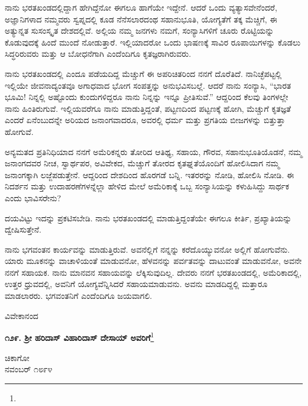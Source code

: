 ನಾನು ಭರತಖಂಡದಲ್ಲಿದ್ದಾಗ ಹೇಗಿದ್ದೆನೋ ಈಗಲೂ ಹಾಗೆಯೇ ಇದ್ದೇನೆ. ಆದರೆ ಒಂದು ವ್ಯತ್ಯಾಸವೇನೆಂದರೆ, ಅಜ್ಞಾನಿಗಳಾದ ನಮ್ಮವರು ಸ್ವಪ್ನದಲ್ಲಿ ಕೂಡ ನೆನೆಸಲಾರದಂಥ ಸಹಾನುಭೂತಿ, ಯೋಗ್ಯತೆಗೆ ತಕ್ಕ ಮೆಚ್ಚಿಗೆ, ಈ ಅತ್ಯುನ್ನತ ಸುಸಂಸ್ಕೃತ ದೇಶದಲ್ಲಿವೆ. ಅಲ್ಲಿಯ ನಮ್ಮ ಜನಗಳು ನಮಗೆ, ಸಂನ್ಯಾಸಿಗಳಿಗೆ ಚೂರು ರೊಟ್ಟಿಯನ್ನು ಕೊಡುವುದಕ್ಕೆ ಹಿಂದೆ ಮುಂದೆ ನೋಡುತ್ತಾರೆ. ಇಲ್ಲಿಯಾದರೋ ಒಂದು ಭಾಷಣಕ್ಕೆ ಸಾವಿರ ರೂಪಾಯಿಗಳನ್ನು ಕೊಡಲು ಸಿದ್ಧರಿರುವರು ಮತ್ತು ಆ ಬೋಧನೆಗಾಗಿ ಎಂದೆಂದಿಗೂ ಕೃತಜ್ಞರಾಗಿರುವರು.

ನಾನು ಭರತಖಂಡದಲ್ಲಿ ಎಂದೂ ಪಡೆಯದಿದ್ದ ಮೆಚ್ಚುಗೆ ಈ ಅಪರಿಚಿತರಿಂದ ನನಗೆ ದೊರೆತಿದೆ. ನಾನಿಚ್ಛೆಪಟ್ಟಲ್ಲಿ ಇಲ್ಲಿಯೇ ಜೀವನಾದ್ಯಂತವೂ ಅಗಾಧವಾದ ಭೋಗ ಸಂಪತ್ತನ್ನು ಅನುಭವಿಸಬಲ್ಲೆ. ಆದರೆ ನಾನು ಸಂನ್ಯಾಸಿ, “ಭಾರತ ಭೂಮಿ! ನಿನ್ನಲ್ಲಿ ಅಷ್ಟೊಂದು ಕುಂದುಗಳಿದ್ದರೂ ನಾನು ನಿನ್ನನ್ನು ಇನ್ನೂ ಪ್ರೀತಿಸುವೆ.” ಆದ್ದರಿಂದ ಕೆಲವು ತಿಂಗಳಲ್ಲೇ ನಾನು ಹಿಂತಿರುಗುವೆ. ಇಲ್ಲಿಯವರೆಗೂ ನಾನು ಮಾಡುತ್ತಿದ್ದಂತೆ, ಪಟ್ಟಣದಿಂದ ಪಟ್ಟಣಕ್ಕೆ ಹೋಗಿ, ಮೆಚ್ಚುಗೆ ಕೃತಜ್ಞತೆ ಎಂದರೆ ಏನೆಂಬುದನ್ನೇ ಅರಿಯದ ಜನಾಂಗವಾದರೂ, ಅವರಲ್ಲಿ ಧರ್ಮ ಮತ್ತು ಪ್ರಗತಿಯ ಬೀಜಗಳನ್ನು ಬಿತ್ತುತ್ತಾ ಹೋಗುವೆ.

ಅನ್ಯಮತದ ಪ್ರತಿನಿಧಿಯಾದ ನನಗೆ ಅಮೆರಿಕನ್ನರು ತೋರಿದ ಆತಿಥ್ಯ, ಸಹಾಯ, ಗೌರವ, ಸಹಾನುಭೂತಿಯೊಡನೆ, ನಮ್ಮ ಜನಾಂಗದವರ ನೀಚ, ಸ್ವಾರ್ಥಪರ, ಅವಿವೇಕದ, ಮೆಚ್ಚುಗೆ ತೋರದ ಕೃತಘ್ನತೆಯೊಂದಿಗೆ ಹೋಲಿಸಿದಾಗ ನಮ್ಮ ಜನಾಂಗಕ್ಕಾಗಿ ಲಜ್ಜೆಪಡುತ್ತೇನೆ. ಆದ್ದರಿಂದ ದೇಶದಿಂದ ಹೊರಗಡೆ ಬನ್ನಿ. ಇತರರನ್ನು ನೋಡಿ, ಹೋಲಿಸಿ ನೋಡಿ. ಈ ನಿದರ್ಶನ ಮತ್ತು ಉದಾಹರಣೆಗಳನ್ನೆಲ್ಲಾ ಹೇಳಿದ ಮೇಲೆ ಅಮೆರಿಕಾಕ್ಕೆ ಒಬ್ಬ ಸಂನ್ಯಾಸಿಯನ್ನು ಕಳುಹಿಸಿದ್ದು ಸಾರ್ಥಕ ಎಂದು ಭಾವಿಸರೇನು?

\newpage

ದಯವಿಟ್ಟು ಇದನ್ನು ಪ್ರಕಟಿಸಬೇಡಿ. ನಾನು ಭರತಖಂಡದಲ್ಲಿ ಮಾಡುತ್ತಿದ್ದಂತೆಯೇ ಈಗಲೂ ಕೀರ್ತಿ, ಪ್ರಖ್ಯಾತಿಯನ್ನು ದ್ವೇಷಿಸುತ್ತೇನೆ.

ನಾನು ಭಗವಂತನ ಕಾರ್ಯವನ್ನು ಮಾಡುತ್ತಿರುವೆ. ಅವನೆಲ್ಲಿಗೆ ನನ್ನನ್ನು ಕರೆದೊಯ್ಯು\break ವನೋ ಅಲ್ಲಿಗೆ ಹೋಗುವೆನು. ಯಾರು ಮೂಕನನ್ನು ವಾಚಾಳಿಯಂತೆ ಮಾಡುವನೋ, ಹೆಳವನನ್ನು ಪರ್ವತವನ್ನು ದಾಟುವಂತೆ ಮಾಡುವನೋ, ಅವನೇ ನನಗೆ ಸಹಾಯಕ. ನಾನು ಮಾನವನ ಸಹಾಯವನ್ನು ಲೆಕ್ಕಿಸುವುದಿಲ್ಲ. ದೇವರು ನನಗೆ ಭರತಖಂಡದಲ್ಲಿ, ಅಮೆರಿಕಾದಲ್ಲಿ, ಉತ್ತರ ಧ್ರುವದಲ್ಲಿ, ಅವನಿಗೆ ಯೋಗ್ಯವೆನ್ನಿಸಿದರೆ ಸಹಾಯಮಾಡುವನು. ಅವನು ಮಾಡದಿದ್ದಲ್ಲಿ ಮತ್ತಾರೂ ಮಾಡಲಾರರು. ಭಗವಂತನಿಗೆ ಎಂದೆಂದಿಗೂ ಜಯವಾಗಲಿ.

\vspace{-0.5cm}

{\flushright
ವಿವೇಕಾನಂದ\par}

\begin{center}
\textbf{೧೨೯. ಶ‍್ರೀ ಹರಿದಾಸ್ ವಿಹಾರಿದಾಸ್ ದೇಸಾಯ್ ಅವರಿಗೆ}\footnote{}
\end{center}

\vspace{-0.5cm}

\begin{flushright}
ಚಿಕಾಗೋ\\ನವಂಬರ್ ೧೮೯೪
\end{flushright}

